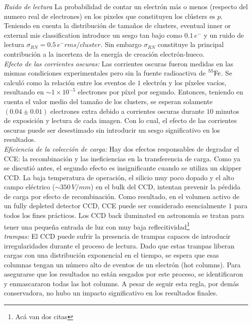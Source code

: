 \indent \textit{Ruido de lectura} La probabilidad de contar un electrón más o menos (respecto del numero real de electrones) en los pixeles que constituyen los clústers es $p$. Teniendo en cuenta la distribución de tamaños de clusters,  eventual inner or external mis classification introduce un sesgo tan bajo como $0.1\,e^{-}$ y un ruido de lectura $\sigma_{RN} = 0.5\,e^{-}\si{rms/cluster}$. Sin embargo $\sigma_{RN}$ constituye la principal contribución a la incerteza de la energía de creación electrón-hueco.\\
\indent \textit{Efecto de las corrientes oscuras:} Las corrientes oscuras fueron medidas en las mismas condiciones experimentales pero sin la fuente radioactiva de $\prescript{55}{}{\mbox{Fe}}$. Se calculó como la relación entre los eventos de $1$ electrón y los píxeles vacíos, resultando en $\sim 1 \times 10^{-5}$ electrones por píxel por segundo. Entonces, teniendo en cuenta el valor medio del tamaño de los clusters, se esperan solamente $(0.04 \pm 0.01)$ electrones extra debido a corrientes oscuras durante $10$ minutos  de exposición y lectura de cada imagen. Con lo cual, el efecto de las corrientes oscuras puede ser desestimado sin introducir un sesgo significativo en los resultados.\\
\indent \textit{Eficiencia de la colección de carga:} Hay dos efectos responsables de degradar el CCE: la recombinación y las ineficiencias en la transferencia de carga. Como ya se discutió antes, el segundo efecto es insignificante cuando se utiliza un skipper CCD. La baja temperatura de operación, el silicio muy poco dopado y el alto campo eléctrico ($\sim350\,\si{V/mm}$) en el bulk del CCD, intentan prevenir la pérdida de carga por efecto de recombinación. Como resultado, en el volumen activo de un fully depleted detector CCD, CCE puede ser considerado esencialmente $1$ para todos los fines prácticos. Los CCD back iluminated en astronomía se tratan para tener una pequeña entrada de luz con muy baja reflecitividad\footnote{Acá van dos citas}\\
\indent \textit{trampas:} El CCD puede sufrir la presencia de trampas capaces de introducir irregularidades durante el proceso de lectura. Dado que estas trampas liberan cargas con una distribución exponencial en el tiempo, se espera que esas columnas tengan un número alto de eventos de un electrón (hot columns). Para asegurarse que los resultados no están sesgados por este proceso, se identificaron y enmascararon todas las hot columns. A pesar de seguir esta regla, por demás conservadora, no hubo un impacto significativo en los resultados finales.\\
